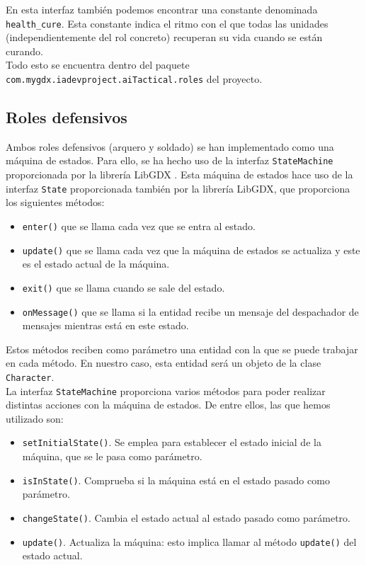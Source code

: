 En esta interfaz también podemos encontrar una constante denominada \texttt{health\_cure}. Esta constante indica el ritmo con el que todas las unidades (independientemente del rol concreto) recuperan su vida cuando se están curando. \\

Todo esto se encuentra dentro del paquete \texttt{com.mygdx.iadevproject.aiTactical.roles} del proyecto.


\medskip
\subsection{Roles defensivos}
Ambos roles defensivos (arquero y soldado) se han implementado como una máquina de estados. Para ello, se ha hecho uso de la interfaz \texttt{StateMachine} proporcionada por la librería LibGDX \cite{stateMachine}. Esta máquina de estados hace uso de la interfaz \texttt{State} proporcionada también por la librería LibGDX, que proporciona los siguientes métodos:
\begin{itemize}
  \item \texttt{enter()} que se llama cada vez que se entra al estado. 
  \item \texttt{update()} que se llama cada vez que la máquina de estados se actualiza y este es el estado actual de la máquina.
  \item \texttt{exit()} que se llama cuando se sale del estado.
  \item \texttt{onMessage()} que se llama si la entidad recibe un mensaje del despachador de mensajes mientras está en este estado. 
\end{itemize}

Estos métodos reciben como parámetro una entidad con la que se puede trabajar en cada método. En nuestro caso, esta entidad será un objeto de la clase \texttt{Character}. \\

La interfaz \texttt{StateMachine} proporciona varios métodos para poder realizar distintas acciones con la máquina de estados. De entre ellos, las que hemos utilizado son:
\begin{itemize}
 \item \texttt{setInitialState()}. Se emplea para establecer el estado inicial de la máquina, que se le pasa como parámetro.
 \item \texttt{isInState()}. Comprueba si la máquina está en el estado pasado como parámetro.
 \item \texttt{changeState()}. Cambia el estado actual al estado pasado como parámetro.
 \item \texttt{update()}. Actualiza la máquina: esto implica llamar al método \texttt{update()} del estado actual. 
\end{itemize}


